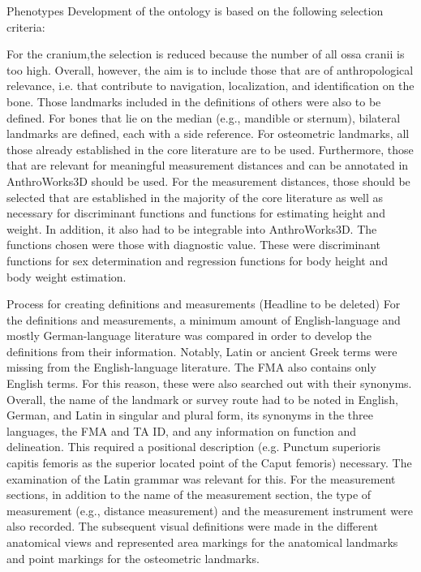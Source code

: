 \documentclass[sw]{iosart2x}
\newcommand{\aw}{AnthroWorks3D}
\begin{document}
Phenotypes 
Development of the ontology is based on the following selection criteria:

For the cranium,the selection is reduced because the number of all ossa cranii is too high.
Overall, however, the aim is to include those that are of anthropological relevance, i.e. that contribute to navigation, localization, and identification on the bone.
Those landmarks included in the definitions of others were also to be defined.
For bones that lie on the median (e.g., mandible or sternum), bilateral landmarks are defined, each with a side reference.
For osteometric landmarks, all those already established in the core literature are to be used.
Furthermore, those that are relevant for meaningful measurement distances and can be annotated in \aw{} should be used.
For the measurement distances, those should be selected that are established in the majority of the core literature as well as necessary for discriminant functions and functions for estimating height and weight.
In addition, it also had to be integrable into \aw{}.
The functions chosen were those with diagnostic value.
These were discriminant functions for sex determination and regression functions for body height and body weight estimation.

Process for creating definitions and measurements (Headline to be deleted) 
For the definitions and measurements, a minimum amount of English-language and mostly German-language literature was compared in order to develop the definitions from their information.
Notably, Latin or ancient Greek terms were missing from the English-language literature.
The FMA also contains only English terms.
For this reason, these were also searched out with their synonyms.
Overall, the name of the landmark or survey route had to be noted in English, German, and Latin in singular and plural form, its synonyms in the three languages, the FMA and TA ID, and any information on function and delineation.
This required a positional description (e.g. Punctum superioris capitis femoris as the superior located point of the Caput femoris) necessary.
The examination of the Latin grammar was relevant for this.
For the measurement sections, in addition to the name of the measurement section, the type of measurement (e.g., distance measurement) and the measurement instrument were also recorded.
The subsequent visual definitions were made in the different anatomical views and represented area markings for the anatomical landmarks and point markings for the osteometric landmarks.
\end{document}
